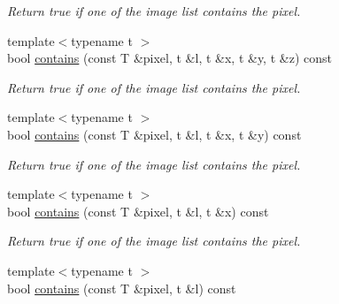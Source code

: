 \begin{DoxyCompactItemize}
\begin{DoxyCompactList}\small\item\em Return {\ttfamily true} if one of the image list contains the pixel. \end{DoxyCompactList}\item 
\hypertarget{structcimg__library_1_1_c_img_list_aa0942de1c4c273704e3993abe20b0462}{{\footnotesize template$<$typename t $>$ }\\bool \hyperlink{structcimg__library_1_1_c_img_list_aa0942de1c4c273704e3993abe20b0462}{contains} (const T \&pixel, t \&l, t \&x, t \&y, t \&z) const }\label{structcimg__library_1_1_c_img_list_aa0942de1c4c273704e3993abe20b0462}

\begin{DoxyCompactList}\small\item\em Return {\ttfamily true} if one of the image list contains the pixel. \end{DoxyCompactList}\item 
\hypertarget{structcimg__library_1_1_c_img_list_ad7d0d0159c5990e12096997412b67570}{{\footnotesize template$<$typename t $>$ }\\bool \hyperlink{structcimg__library_1_1_c_img_list_ad7d0d0159c5990e12096997412b67570}{contains} (const T \&pixel, t \&l, t \&x, t \&y) const }\label{structcimg__library_1_1_c_img_list_ad7d0d0159c5990e12096997412b67570}

\begin{DoxyCompactList}\small\item\em Return {\ttfamily true} if one of the image list contains the pixel. \end{DoxyCompactList}\item 
\hypertarget{structcimg__library_1_1_c_img_list_ac496dda2de5723afe8d76fa9477d4c85}{{\footnotesize template$<$typename t $>$ }\\bool \hyperlink{structcimg__library_1_1_c_img_list_ac496dda2de5723afe8d76fa9477d4c85}{contains} (const T \&pixel, t \&l, t \&x) const }\label{structcimg__library_1_1_c_img_list_ac496dda2de5723afe8d76fa9477d4c85}

\begin{DoxyCompactList}\small\item\em Return {\ttfamily true} if one of the image list contains the pixel. \end{DoxyCompactList}\item 
\hypertarget{structcimg__library_1_1_c_img_list_a020498361ebba7426b49b7cf62f6d3b1}{{\footnotesize template$<$typename t $>$ }\\bool \hyperlink{structcimg__library_1_1_c_img_list_a020498361ebba7426b49b7cf62f6d3b1}{contains} (const T \&pixel, t \&l) const }\label{structcimg__library_1_1_c_img_list_a020498361ebba7426b49b7cf62f6d3b1}


\end{DoxyCompactItemize}
